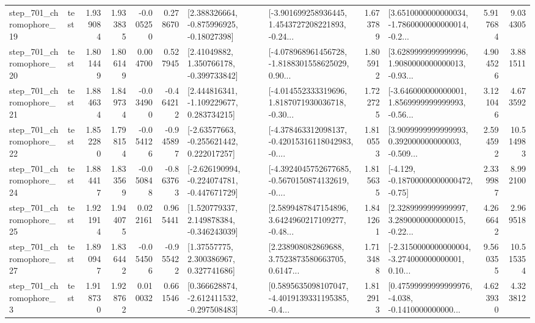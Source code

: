 \begin{tabular}{llrrrrllrlrr}
  step\_701\_chromophore\_19 &      test &      1.939084 &    1.933835 &     -0.005250 &  0.278670 &    [2.388326664, -0.875996925, -0.18027398] &  [-3.901699258936445, 1.4543727208221893, -0.24... &       1.673789 &  [3.6510000000000034, -1.7860000000000014, -0.2... &            5.917684 &          9.034305 \\
  step\_701\_chromophore\_20 &      test &      1.801449 &    1.806149 &      0.004700 &  0.527945 &     [2.41049882, 1.350766178, -0.399733842] &  [-4.078968961456728, -1.8188301558625029, 0.90... &       1.805912 &  [3.6289999999999996, 1.9080000000000013, -0.93... &            4.904526 &          3.881511 \\
  step\_701\_chromophore\_21 &      test &      1.884634 &    1.849734 &     -0.034900 & -0.464212 &    [2.444816341, -1.109229677, 0.283734215] &  [-4.014552333319696, 1.8187071930036718, -0.30... &       1.722725 &  [-3.646000000000001, 1.8569999999999993, -0.56... &            3.121046 &          4.673592 \\
  step\_701\_chromophore\_22 &      test &      1.852280 &    1.798154 &     -0.054126 & -0.945897 &    [-2.63577663, -0.255621442, 0.222017257] &  [-4.378463312098137, -0.42015316118042983, -0.... &       1.810553 &  [3.9099999999999993, 0.392000000000003, -0.509... &            2.594592 &         10.514983 \\
  step\_701\_chromophore\_24 &      test &      1.884417 &    1.833569 &     -0.050848 & -0.863763 &  [-2.626190994, -0.224074781, -0.447671729] &  [-4.3924045752677685, -0.5670150874132619, -0.... &       1.815635 &              [-4.129, -0.18700000000000472, -0.75] &            2.339987 &          8.992100 \\
  step\_701\_chromophore\_25 &      test &      1.921914 &    1.944075 &      0.022161 &  0.965441 &    [1.520779337, 2.149878384, -0.346243039] &  [2.5899487847154896, 3.6424960217109277, -0.48... &       1.841261 &  [2.3289999999999997, 3.2890000000000015, -0.22... &            4.266642 &          2.969518 \\
  step\_701\_chromophore\_27 &      test &      1.890947 &    1.836442 &     -0.054506 & -0.955422 &      [1.37557775, 2.300386967, 0.327741686] &  [2.238908082869688, 3.7523873580663705, 0.6147... &       1.713488 &  [-2.3150000000000004, -3.274000000000001, 0.10... &            9.560355 &         10.515354 \\
   step\_701\_chromophore\_3 &      test &      1.918730 &    1.928762 &      0.010032 &  0.661546 &   [0.366628874, -2.612411532, -0.297508483] &  [0.5895635098107047, -4.4019139331195385, -0.4... &       1.812913 &  [0.47599999999999976, -4.038, -0.1410000000000... &            4.623930 &          4.323812 \\

\end{tabular}
